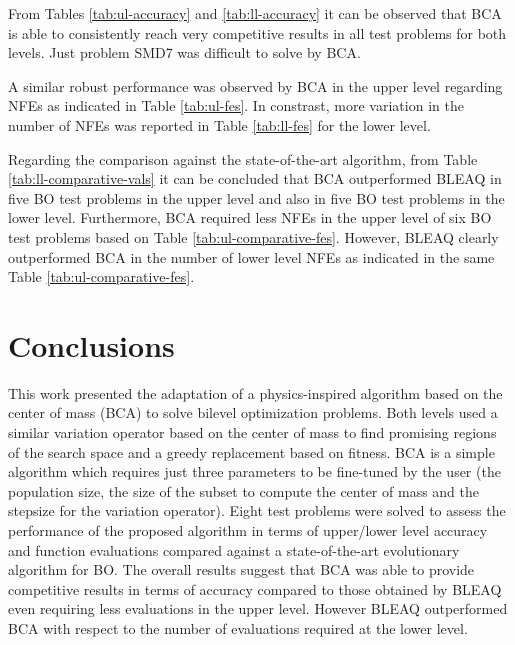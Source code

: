 \documentclass[conference]{IEEEtran}
\begin{document}
From Tables \ref{tab:ul-accuracy} and \ref{tab:ll-accuracy} it can be observed
that BCA is able to consistently reach very competitive results in all test problems
for both levels. Just problem SMD7 was difficult to solve by BCA. 

A similar robust performance was observed by BCA in the upper level regarding NFEs
as indicated in Table \ref{tab:ul-fes}. In constrast, more variation in the number
of NFEs was reported in Table \ref{tab:ll-fes} for the lower level. 



Regarding the comparison against the state-of-the-art algorithm, from Table \ref{tab:ll-comparative-vals}
it can be concluded that BCA outperformed BLEAQ in five BO test problems in the
upper level and also in five BO test problems in the lower level. Furthermore,
BCA required less NFEs in the upper level of six BO test problems based on
Table \ref{tab:ul-comparative-fes}. However, BLEAQ clearly outperformed BCA in
the number of lower level NFEs as indicated in the same Table \ref{tab:ul-comparative-fes}.



\section{Conclusions}
\label{sec:conclu}

This work presented the adaptation of a physics-inspired algorithm based on the
center of mass (BCA) to solve bilevel optimization problems. Both levels used a
similar variation operator based on the center of mass to find promising regions
of the search space and a greedy replacement based on fitness. BCA is a simple
algorithm which requires just three parameters to be fine-tuned by the user (the
population size, the size of the subset to compute the center of mass and the
stepsize for the variation operator). Eight test problems were solved to assess
the performance of the proposed algorithm in terms of upper/lower level accuracy
and function evaluations compared against a state-of-the-art evolutionary algorithm
for BO. The overall results suggest that BCA was able to provide competitive
results in terms of accuracy compared to those obtained by BLEAQ even requiring
less evaluations in the upper level. However BLEAQ outperformed BCA with respect
to the number of evaluations required at the lower level.
\end{document}
